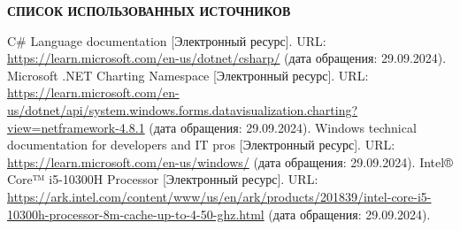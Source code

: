 \renewcommand{\bibname}{}
\begin{thebibliography}{6}
\renewcommand{\bibname}{СПИСОК ИСПОЛЬЗОВАННЫХ ИСТОЧНИКОВ}
\begin{center}
    \textbf{\bibname}
\end{center}
    C\# Language documentation [Электронный ресурс]. URL: \url{https://learn.microsoft.com/en-us/dotnet/csharp/} (дата обращения: 29.09.2024).
	Microsoft .NET Charting Namespace [Электронный ресурс]. URL: \url{https://learn.microsoft.com/en-us/dotnet/api/system.windows.forms.datavisualization.charting?view=netframework-4.8.1} (дата обращения: 29.09.2024).
    Windows technical documentation for developers and IT pros [Электронный ресурс]. URL:
    \url{https://learn.microsoft.com/en-us/windows/} (дата обращения: 29.09.2024).
	Intel® Core™ i5-10300H Processor [Электронный ресурс]. URL: \url{https://ark.intel.com/content/www/us/en/ark/products/201839/intel-core-i5-10300h-processor-8m-cache-up-to-4-50-ghz.html} (дата обращения: 29.09.2024).
	
\end{thebibliography}